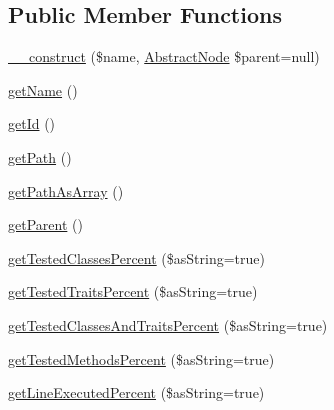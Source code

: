 \subsection*{Public Member Functions}
\begin{DoxyCompactItemize}
\item 
\mbox{\hyperlink{class_sebastian_bergmann_1_1_code_coverage_1_1_node_1_1_abstract_node_ab6558ed33f8b177c020a6fba5ce71678}{\+\_\+\+\_\+construct}} (\$name, \mbox{\hyperlink{class_sebastian_bergmann_1_1_code_coverage_1_1_node_1_1_abstract_node}{Abstract\+Node}} \$parent=null)
\item 
\mbox{\hyperlink{class_sebastian_bergmann_1_1_code_coverage_1_1_node_1_1_abstract_node_a3d0963e68bb313b163a73f2803c64600}{get\+Name}} ()
\item 
\mbox{\hyperlink{class_sebastian_bergmann_1_1_code_coverage_1_1_node_1_1_abstract_node_a12251d0c022e9e21c137a105ff683f13}{get\+Id}} ()
\item 
\mbox{\hyperlink{class_sebastian_bergmann_1_1_code_coverage_1_1_node_1_1_abstract_node_a30c5c67b2bf8e2e2ccc7e361faa20afe}{get\+Path}} ()
\item 
\mbox{\hyperlink{class_sebastian_bergmann_1_1_code_coverage_1_1_node_1_1_abstract_node_ae82f8a0b34ff7a890be384d7138283a5}{get\+Path\+As\+Array}} ()
\item 
\mbox{\hyperlink{class_sebastian_bergmann_1_1_code_coverage_1_1_node_1_1_abstract_node_a95ecaee3537b1ad29b04ef383a57bbae}{get\+Parent}} ()
\item 
\mbox{\hyperlink{class_sebastian_bergmann_1_1_code_coverage_1_1_node_1_1_abstract_node_af7bb34b64df029e696ad4c38b257ef21}{get\+Tested\+Classes\+Percent}} (\$as\+String=true)
\item 
\mbox{\hyperlink{class_sebastian_bergmann_1_1_code_coverage_1_1_node_1_1_abstract_node_a3bc92d0da1132d01487fa6f373646058}{get\+Tested\+Traits\+Percent}} (\$as\+String=true)
\item 
\mbox{\hyperlink{class_sebastian_bergmann_1_1_code_coverage_1_1_node_1_1_abstract_node_a6df114ad07fe44f52263a7aa74792530}{get\+Tested\+Classes\+And\+Traits\+Percent}} (\$as\+String=true)
\item 
\mbox{\hyperlink{class_sebastian_bergmann_1_1_code_coverage_1_1_node_1_1_abstract_node_af1e90671391032e539c92ce26a3bbe9d}{get\+Tested\+Methods\+Percent}} (\$as\+String=true)
\item 
\mbox{\hyperlink{class_sebastian_bergmann_1_1_code_coverage_1_1_node_1_1_abstract_node_ae883f8e9479e69af89798ab531505c8b}{get\+Line\+Executed\+Percent}} (\$as\+String=true)

\end{DoxyCompactItemize}
